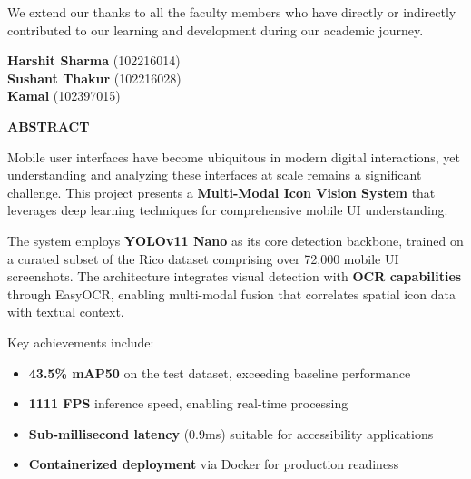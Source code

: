 \documentclass[11pt,a4paper]{report}
\begin{document}
\vspace{0.5cm}
\noindent We extend our thanks to all the faculty members who have directly or indirectly contributed to our learning and development during our academic journey.

\vspace{2cm}
\begin{flushright}
    \textbf{Harshit Sharma} (102216014)\\
    \textbf{Sushant Thakur} (102216028)\\
    \textbf{Kamal} (102397015)
\end{flushright}

\newpage
\thispagestyle{empty}
\begin{center}
    {\Large\bfseries\color{tietnavy} ABSTRACT}\\[1cm]
\end{center}

\noindent Mobile user interfaces have become ubiquitous in modern digital interactions, yet understanding and analyzing these interfaces at scale remains a significant challenge. This project presents a \textbf{Multi-Modal Icon Vision System} that leverages deep learning techniques for comprehensive mobile UI understanding.

\vspace{0.5cm}
\noindent The system employs \textbf{YOLOv11 Nano} as its core detection backbone, trained on a curated subset of the Rico dataset comprising over 72,000 mobile UI screenshots. The architecture integrates visual detection with \textbf{OCR capabilities} through EasyOCR, enabling multi-modal fusion that correlates spatial icon data with textual context.

\vspace{0.5cm}
\noindent Key achievements include:
\begin{itemize}
    \item \textbf{43.5\% mAP50} on the test dataset, exceeding baseline performance
    \item \textbf{1111 FPS} inference speed, enabling real-time processing
    \item \textbf{Sub-millisecond latency} (0.9ms) suitable for accessibility applications
    \item \textbf{Containerized deployment} via Docker for production readiness
\end{itemize}
\end{document}
